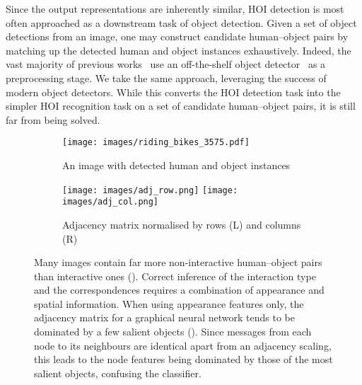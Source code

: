 \documentclass[10pt,twocolumn,letterpaper]{article}
\begin{document}
Since the output representations are inherently similar, HOI detection is most often approached as a downstream task of object detection. Given a set of object detections from an image, one may construct candidate human--object pairs by matching up the detected human and object instances exhaustively. Indeed, the vast majority of previous works~\cite{chao2018, gao2018, gupta2019, li2019, qi2018, peyre2019, ulutan2020, gao2020, wang2020} use an off-the-shelf object detector~\cite{ren2015} as a preprocessing stage. We take the same approach, leveraging the success of modern object detectors. While this converts the HOI detection task into the simpler HOI recognition task on a set of candidate human--object pairs, it is still far from being solved.

\begin{figure}[t]\centering
   \begin{subfigure}[t]{\linewidth}
      \centering
	   \texttt{[image: images/riding\_bikes\_3575.pdf]}
      \caption{An image with detected human and object instances}
      \label{fig:riding_bikes}
   \end{subfigure}
   
   \begin{subfigure}[t]{\linewidth}
      \centering
	   \texttt{[image: images/adj\_row.png]}
      \texttt{[image: images/adj\_col.png]}
      \caption{Adjacency matrix normalised by rows (L) and columns (R)}
      \label{fig:adj_baseline}
   \end{subfigure}
   \newline
   \caption{Many images contain far more non-interactive human--object pairs than interactive ones (). Correct inference of the interaction type and the correspondences requires a combination of appearance and spatial information. When using appearance features only, the adjacency matrix for a graphical neural network tends to be dominated by a few salient objects (). Since messages from each node to its neighbours are identical apart from an adjacency scaling, this leads to the node features being dominated by those of the most salient objects, confusing the classifier.}
   \label{fig:teaser}
\end{figure}
\end{document}
